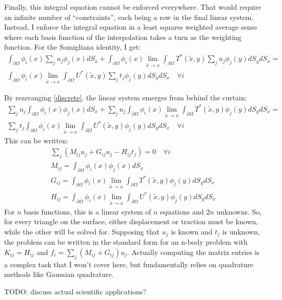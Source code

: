 \documentclass[10pt]{article}
\newcommand{\pO}{\partial \Omega}
\begin{document}
Finally, this integral equation cannot be enforced everywhere. That would require an infinite number of ``constraints'', each being a row in the final linear system. Instead, I enforce the integral equation in a least squares weighted average sense where each basis function of the interpolation takes a turn as the weighting function. For the Somigliana identity, I get:
\begin{multline}
    \int_{\pO}\phi_i(x)\displaystyle\sum_ju_j\phi_j(x)dS_x + \int_{\pO}\phi_i(x)\lim_{\tilde{x} \to x}\int_{\pO} T^*(\tilde{x}, y)\sum_ju_j\phi_j(y) dS_ydS_x = \\ 
    \int_{\pO}\phi_i(x)\lim_{\tilde{x} \to x}\int_{\pO} U^*(\tilde{x},y)\sum_jt_j\phi_j(y) dS_ydS_x \quad \forall i
    \label{discrete}
\end{multline}

By rearranging \ref{discrete}, the linear system emerges from behind the curtain: 
\begin{multline}
    \displaystyle\sum_ju_j\int_{\pO}\phi_i(x)\phi_j(x)dS_x + \sum_ju_j\int_{\pO}\phi_i(x)\lim_{\tilde{x} \to x}\int_{\pO} T^*(\tilde{x}, y)\phi_j(y) dS_ydS_x = \\ 
    \sum_jt_j\int_{\pO}\phi_i(x)\lim_{\tilde{x} \to x}\int_{\pO} U^*(\tilde{x},y)\phi_j(y) dS_ydS_x \quad \forall i
\end{multline}
This can be written:
\begin{eqnarray}
    \sum_j(M_{ij}u_j + G_{ij}u_j - H_{ij}t_j) = 0 \quad \forall i\\
    M_{ij} = \int_{\pO}\phi_i(x)\phi_j(x)dS_x\\
    G_{ij} = \int_{\pO}\phi_i(x)\lim_{\tilde{x} \to x}\int_{\pO} T^*(\tilde{x}, y)\phi_j(y) dS_ydS_x\\
    H_{ij} = \int_{\pO}\phi_i(x)\lim_{\tilde{x} \to x}\int_{\pO} U^*(\tilde{x},y)\phi_j(y) dS_ydS_x
\end{eqnarray}
For $n$ basis functions, this is a linear system of $n$ equations and $2n$ unknowns. So, for every triangle on the surface, either displacement or traction must be known, while the other will be solved for. Supposing that $u_j$ is known and $t_j$ is unknown, the problem can be written in the standard form for an n-body problem with $K_{ij} = H_{ij}$ and $f_i = \sum_j (M_{ij} + G_{ij})u_j$. Actually computing the matrix entries is a complex task that I won't cover here, but fundamentally relies on quadrature methods like Gaussian quadrature.

TODO: discuss actual scientific applications?
\end{document}
